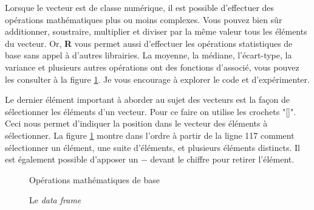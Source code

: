 \documentclass[10.5pt,a4paper]{article}
\begin{document}
    Lorsque le vecteur est de classe numérique, il est possible d'effectuer des opérations mathématiques plus ou moins complexes. Vous pouvez bien sûr additionner, soustraire, multiplier et diviser par la même valeur tous les éléments du vecteur. Or, \textbf{R} vous permet aussi d'effectuer les opérations statistiques de base sans appel à d'autres librairies. La moyenne, la médiane, l'écart-type, la variance et plusieurs autres opérations ont des fonctions d'associé, vous pouvez les consulter à la figure \ref{struVec2}. Je vous encourage à explorer le code et d'expérimenter. 
    
    Le dernier élément important à aborder au sujet des vecteurs est la façon de sélectionner les éléments d'un vecteur. Pour ce faire on utilise les crochets "[]". Ceci nous permet d'indiquer la position dans le vecteur des éléments à sélectionner. La figure \ref{struVec2} montre dans l'ordre à partir de la ligne 117 comment sélectionner un élément, une suite d'éléments, et plusieurs éléments distincts. Il est également possible d'apposer un $-$ devant le chiffre pour retirer l'élément. 
    
    \begin{figure}[H]
    \centering
    \caption{Opérations mathématiques de base}
    \label{struVec2}
    \end{figure}
    
    \begin{figure}[H]
    \centering
    \caption{Le \emph{data frame}}
    \label{struDataF}
    \end{figure}
    
\end{document}
